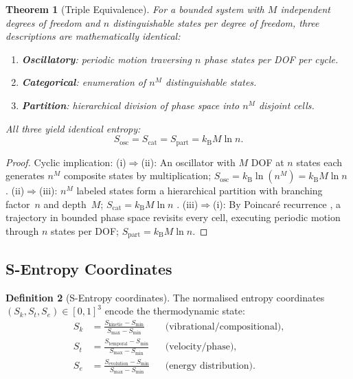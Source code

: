 \documentclass[10pt,twocolumn]{article}
\newtheorem{theorem}{Theorem}[section]
\theoremstyle{definition}
\newtheorem{definition}[theorem]{Definition}
\theoremstyle{remark}
\newcommand{\kB}{k_{\mathrm{B}}}
\newcommand{\Sk}{S_k}
\newcommand{\St}{S_t}
\newcommand{\Se}{S_e}
\begin{document}
\begin{theorem}[Triple Equivalence]\label{thm:triple}
For a bounded system with $M$ independent degrees of freedom
and $n$ distinguishable states per degree of freedom, three
descriptions are mathematically identical:
\begin{enumerate}[label=(\roman*),leftmargin=*,itemsep=1pt]
\item \textbf{Oscillatory}: periodic motion traversing $n$
  phase states per DOF per cycle.
\item \textbf{Categorical}: enumeration of $n^M$
  distinguishable states.
\item \textbf{Partition}: hierarchical division of phase space
  into $n^M$ disjoint cells.
\end{enumerate}
All three yield identical entropy:
\begin{equation}\label{eq:triple}
  S_{\mathrm{osc}} = S_{\mathrm{cat}} = S_{\mathrm{part}}
  = \kB M\ln n.
\end{equation}
\end{theorem}

\begin{proof}
Cyclic implication:
(i)$\Rightarrow$(ii): An oscillator with $M$ DOF at $n$ states
each generates $n^M$ composite states by multiplication;
$S_{\mathrm{osc}}=\kB\ln(n^M)=\kB M\ln n$
\citep{Boltzmann1896,Gibbs1902}.
(ii)$\Rightarrow$(iii): $n^M$ labeled states form a
hierarchical partition with branching factor~$n$ and depth~$M$;
$S_{\mathrm{cat}}=\kB M\ln n$ \citep{Shannon1948}.
(iii)$\Rightarrow$(i): By Poincar\'e recurrence
\citep{Poincare1890}, a trajectory in bounded phase space
revisits every cell, executing periodic motion through $n$
states per DOF; $S_{\mathrm{part}}=\kB M\ln n$.
\end{proof}

\subsection{S-Entropy Coordinates}\label{sec:sentropy}

\begin{definition}[S-Entropy coordinates]\label{def:sentropy}
The normalised entropy coordinates
$(\Sk,\St,\Se)\in[0,1]^3$ encode the thermodynamic state:
\begin{align}
  \Sk &= \frac{S_{\mathrm{kinetic}}-S_{\min}}{S_{\max}-S_{\min}}
    &&\text{(vibrational/compositional)},\label{eq:Sk}\\
  \St &= \frac{S_{\mathrm{temporal}}-S_{\min}}{S_{\max}-S_{\min}}
    &&\text{(velocity/phase)},\label{eq:St}\\
  \Se &= \frac{S_{\mathrm{evolution}}-S_{\min}}{S_{\max}-S_{\min}}
    &&\text{(energy distribution)}.\label{eq:Se}
\end{align}
\end{definition}
\end{document}
